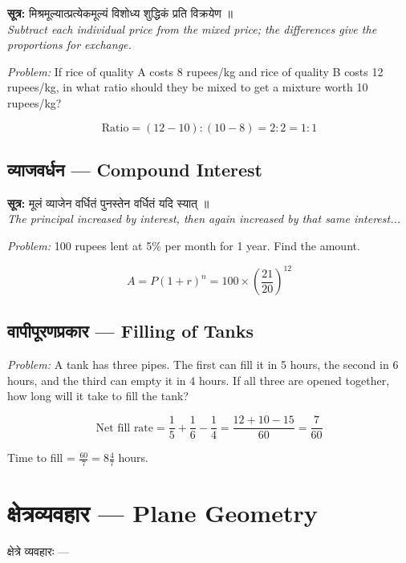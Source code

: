 \documentclass[10pt,a4paper]{article}
\newenvironment{sanskritverse}{%
  \begin{center}%
  \begin{minipage}{0.94\textwidth}%
  \centering\devanagarifont\small%
}{%
  \end{minipage}%
  \end{center}%
  \vspace{0.1em}%
}
\begin{document}
\begin{sanskritverse}
\textbf{सूत्र:} मिश्रमूल्यात्प्रत्येकमूल्यं विशोध्य शुद्धिकं प्रति विक्रयेण ॥\\
\textit{Subtract each individual price from the mixed price; the differences give the proportions for exchange.}
\end{sanskritverse}

\textit{Problem:} If rice of quality A costs 8 rupees/kg and rice of quality B costs 12 rupees/kg, in what ratio should they be mixed to get a mixture worth 10 rupees/kg?

\[
\text{Ratio} = (12 - 10) : (10 - 8) = 2 : 2 = 1 : 1
\]

\subsection{व्याजवर्धन — Compound Interest}

\begin{sanskritverse}
\textbf{सूत्र:} मूलं व्याजेन वर्धितं पुनस्तेन वर्धितं यदि स्यात् ॥\\
\textit{The principal increased by interest, then again increased by that same interest...}
\end{sanskritverse}

\textit{Problem:} 100 rupees lent at 5\% per month for 1 year. Find the amount.

\[
A = P(1 + r)^n = 100 \times \left(\frac{21}{20}\right)^{12}
\]

\subsection{वापीपूरणप्रकार — Filling of Tanks}

\textit{Problem:} A tank has three pipes. The first can fill it in 5 hours, the second in 6 hours, and the third can empty it in 4 hours. If all three are opened together, how long will it take to fill the tank?

\[
\text{Net fill rate} = \frac{1}{5} + \frac{1}{6} - \frac{1}{4} = \frac{12 + 10 - 15}{60} = \frac{7}{60}
\]

Time to fill = $\frac{60}{7} = 8\frac{4}{7}$ hours.

\section{क्षेत्रव्यवहार — Plane Geometry}
\label{sec:ksetra}

\begin{sanskritverse}
क्षेत्रे व्यवहारः ---
\end{sanskritverse}
\end{document}
